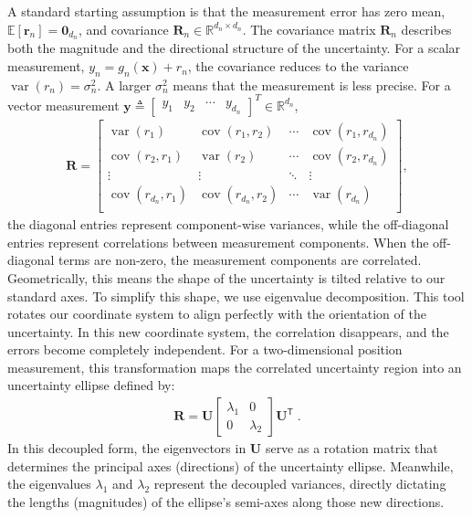 \documentclass{ieeeaccess}
\begin{document}
A standard starting assumption is that the measurement error has zero mean, $\mathbb{E}[\mathbf{r}_n]=\mathbf{0}_{d_n}$, and covariance $\mathbf{R}_n\in\mathbb{R}^{d_n\times d_n}$. The covariance matrix $\mathbf{R}_n$ describes both the magnitude and the directional structure of the uncertainty. For a scalar measurement, $y_n=g_n(\mathbf{x})+r_n$, the covariance reduces to the variance $\operatorname{var}(r_n)=\sigma_n^2$. A larger $\sigma_n^2$ means that the measurement is less precise. For a vector measurement $\mathbf{y}\triangleq \begin{bmatrix} y_{1} & y_{2} & \cdots & y_{d_n} \end{bmatrix}^T \in \mathbb{R}^{d_n}$,
\begin{align*}
\mathbf{R}=
\begin{bmatrix}
\operatorname{var}(r_{1}) & \operatorname{cov}(r_{1},r_{2}) & \cdots & \operatorname{cov}(r_{1},r_{d_n})\\
\operatorname{cov}(r_{2},r_{1}) & \operatorname{var}(r_{2}) & \cdots & \operatorname{cov}(r_{2},r_{d_n}) \\
\vdots & \vdots & \ddots & \vdots\\
\operatorname{cov}(r_{d_n},r_{1})  & \operatorname{cov}(r_{d_n},r_{2}) & \cdots & \operatorname{var}(r_{d_n}) \\
\end{bmatrix},
\end{align*}
the diagonal entries represent component-wise variances, while the off-diagonal entries represent correlations between measurement components. When the off-diagonal terms are non-zero, the measurement components are correlated. Geometrically, this means the shape of the uncertainty is tilted relative to our standard axes. To simplify this shape, we use eigenvalue decomposition. This tool rotates our coordinate system to align perfectly with the orientation of the uncertainty. In this new coordinate system, the correlation disappears, and the errors become completely independent. For a two-dimensional position measurement, this transformation maps the correlated uncertainty region into an uncertainty ellipse defined by:
\begin{align*}
\mathbf{R}=\mathbf{U}\left[\begin{matrix}\lambda _{1}&0\\ 0&\lambda _{2}\end{matrix}\right]\mathbf{U}^{\mathsf{T}} \;.
\end{align*}
In this decoupled form, the eigenvectors in $\mathbf{U}$ serve as a rotation matrix that determines the principal axes (directions) of the uncertainty ellipse. Meanwhile, the eigenvalues $\lambda _{1}$ and $\lambda _{2}$ represent the decoupled variances, directly dictating the lengths (magnitudes) of the ellipse's semi-axes along those new directions.
\end{document}
